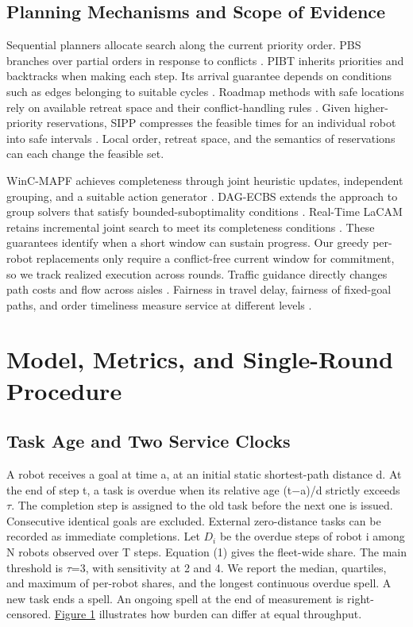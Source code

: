 \documentclass{article}
\begin{document}
\subsection{Planning Mechanisms and Scope of Evidence}
Sequential planners allocate search along the current priority order. PBS branches over partial orders in response to conflicts \citep{ma2019}. PIBT inherits priorities and backtracks when making each step. Its arrival guarantee depends on conditions such as edges belonging to suitable cycles \citep{okumura2022}. Roadmap methods with safe locations rely on available retreat space and their conflict-handling rules \citep{klancar2026}. Given higher-priority reservations, SIPP compresses the feasible times for an individual robot into safe intervals \citep{phillips2011}. Local order, retreat space, and the semantics of reservations can each change the feasible set.

WinC-MAPF achieves completeness through joint heuristic updates, independent grouping, and a suitable action generator \citep{veerapaneni2025}. DAG-ECBS extends the approach to group solvers that satisfy bounded-suboptimality conditions \citep{zhang2026dag}. Real-Time LaCAM retains incremental joint search to meet its completeness conditions \citep{liang2025}. These guarantees identify when a short window can sustain progress. Our greedy per-robot replacements only require a conflict-free current window for commitment, so we track realized execution across rounds. Traffic guidance directly changes path costs and flow across aisles \citep{chen2024,zhang2024,zang2025}. Fairness in travel delay, fairness of fixed-goal paths, and order timeliness measure service at different levels \citep{asano2023,anand2026,zhang2024queue}.

\section{Model, Metrics, and Single-Round Procedure}
\subsection{Task Age and Two Service Clocks}
A robot receives a goal at time a, at an initial static shortest-path distance d. At the end of step t, a task is overdue when its relative age (t\ensuremath{-}a)/d strictly exceeds \ensuremath{\tau}. The completion step is assigned to the old task before the next one is issued. Consecutive identical goals are excluded. External zero-distance tasks can be recorded as immediate completions. Let $D_i$ be the overdue steps of robot i among N robots observed over T steps. Equation (1) gives the fleet-wide share. The main threshold is \ensuremath{\tau}=3, with sensitivity at 2 and 4. We report the median, quartiles, and maximum of per-robot shares, and the longest continuous overdue spell. A new task ends a spell. An ongoing spell at the end of measurement is right-censored. \hyperlink{display:Figure1}{Figure 1} illustrates how burden can differ at equal throughput.
\end{document}
